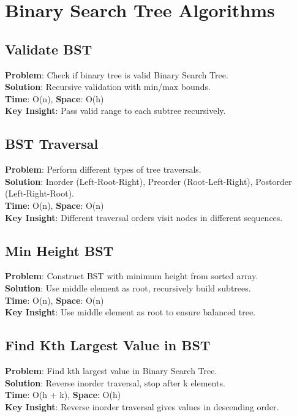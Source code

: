 \documentclass{report}
\begin{document}
\section{Binary Search Tree Algorithms}

\subsection{Validate BST}
\textbf{Problem}: Check if binary tree is valid Binary Search Tree.\\
\textbf{Solution}: Recursive validation with min/max bounds.\\
\textbf{Time}: O(n), \textbf{Space}: O(h)\\
\textbf{Key Insight}: Pass valid range to each subtree recursively.

\subsection{BST Traversal}
\textbf{Problem}: Perform different types of tree traversals.\\
\textbf{Solution}: Inorder (Left-Root-Right), Preorder (Root-Left-Right), Postorder (Left-Right-Root).\\
\textbf{Time}: O(n), \textbf{Space}: O(n)\\
\textbf{Key Insight}: Different traversal orders visit nodes in different sequences.

\subsection{Min Height BST}
\textbf{Problem}: Construct BST with minimum height from sorted array.\\
\textbf{Solution}: Use middle element as root, recursively build subtrees.\\
\textbf{Time}: O(n), \textbf{Space}: O(n)\\
\textbf{Key Insight}: Use middle element as root to ensure balanced tree.

\subsection{Find Kth Largest Value in BST}
\textbf{Problem}: Find kth largest value in Binary Search Tree.\\
\textbf{Solution}: Reverse inorder traversal, stop after k elements.\\
\textbf{Time}: O(h + k), \textbf{Space}: O(h)\\
\textbf{Key Insight}: Reverse inorder traversal gives values in descending order.
\end{document}
